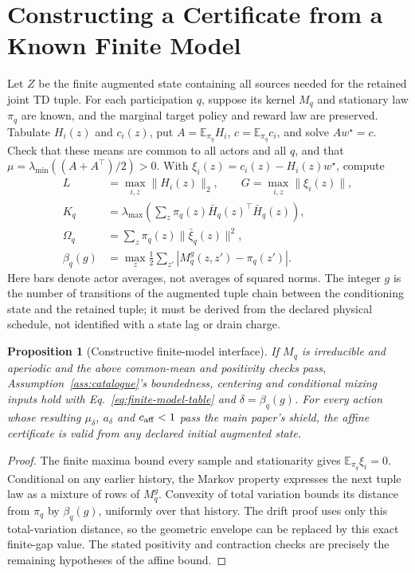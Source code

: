 \documentclass[journal]{IEEEtran}
\newcommand{\E}{\mathbb E}
\newtheorem{proposition}{Proposition}
\begin{document}
\section{Constructing a Certificate from a Known Finite Model}
Let $Z$ be the finite augmented state containing all sources needed for the retained joint TD tuple.
For each participation $q$, suppose its kernel $M_q$ and stationary law $\pi_q$ are known, and the marginal target policy and reward law are preserved.
Tabulate $H_i(z)$ and $c_i(z)$, put $A=\E_{\pi_q}H_i$, $c=\E_{\pi_q}c_i$, and solve $Aw^\star=c$.
Check that these means are common to all actors and all $q$, and that $\mu=\lambda_{\min}((A+A^\top)/2)>0$.
With $\xi_i(z)=c_i(z)-H_i(z)w^\star$, compute
\begin{align}
L&=\max_{i,z}\|H_i(z)\|_2,\qquad G=\max_{i,z}\|\xi_i(z)\|,\nonumber\\
K_q&=\lambda_{\max}\!\left(\sum_z\pi_q(z)\bar H_q(z)^\top\bar H_q(z)\right),\nonumber\\
\Omega_q&=\sum_z\pi_q(z)\|\bar\xi_q(z)\|^2,\nonumber\\
\beta_q(g)&=\max_z\frac12\sum_{z'}|M_q^g(z,z')-\pi_q(z')|.
\label{eq:finite-model-table}
\end{align}
Here bars denote actor averages, not averages of squared norms.
The integer $g$ is the number of transitions of the augmented tuple chain between the conditioning state and the retained tuple; it must be derived from the declared physical schedule, not identified with a state lag or drain charge.

\begin{proposition}[Constructive finite-model interface]
If $M_q$ is irreducible and aperiodic and the above common-mean and positivity checks pass, Assumption~\ref{ass:catalogue}'s boundedness, centering and conditional mixing inputs hold with Eq.~\eqref{eq:finite-model-table} and $\delta=\beta_q(g)$.
For every action whose resulting $\mu_\delta$, $a_\delta$ and $c_{\rm aff}<1$ pass the main paper's shield, the affine certificate is valid from any declared initial augmented state.
\end{proposition}
\begin{proof}
The finite maxima bound every sample and stationarity gives $\E_{\pi_q}\xi_i=0$.
Conditional on any earlier history, the Markov property expresses the next tuple law as a mixture of rows of $M_q^g$.
Convexity of total variation bounds its distance from $\pi_q$ by $\beta_q(g)$, uniformly over that history.
The drift proof uses only this total-variation distance, so the geometric envelope can be replaced by this exact finite-gap value.
The stated positivity and contraction checks are precisely the remaining hypotheses of the affine bound.
\end{proof}
\end{document}
